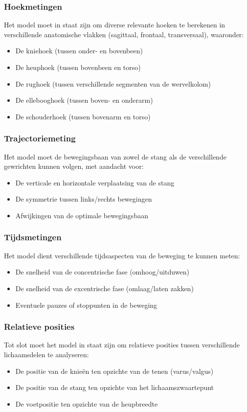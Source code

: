 \subsubsection{Hoekmetingen}
Het model moet in staat zijn om diverse relevante hoeken te berekenen in verschillende anatomische vlakken (sagittaal, frontaal, transversaal), waaronder:
\begin{itemize}
    \item De kniehoek (tussen onder- en bovenbeen)
    \item De heuphoek (tussen bovenbeen en torso)
    \item De rughoek (tussen verschillende segmenten van de wervelkolom)
    \item De ellebooghoek (tussen boven- en onderarm)
    \item De schouderhoek (tussen bovenarm en torso)
\end{itemize}

\subsubsection{Trajectoriemeting}
Het model moet de bewegingsbaan van zowel de stang als de verschillende gewrichten kunnen volgen, met aandacht voor:
\begin{itemize}
    \item De verticale en horizontale verplaatsing van de stang
    \item De symmetrie tussen links/rechts bewegingen
    \item Afwijkingen van de optimale bewegingsbaan
\end{itemize}

\subsubsection{Tijdsmetingen}
Het model dient verschillende tijdsaspecten van de beweging te kunnen meten:
\begin{itemize}
    \item De snelheid van de concentrische fase (omhoog/uitduwen)
    \item De snelheid van de excentrische fase (omlaag/laten zakken)
    \item Eventuele pauzes of stoppunten in de beweging
\end{itemize}

\subsubsection{Relatieve posities}
Tot slot moet het model in staat zijn om relatieve posities tussen verschillende lichaamsdelen te analyseren:
\begin{itemize}
    \item De positie van de knieën ten opzichte van de tenen (varus/valgus)
    \item De positie van de stang ten opzichte van het lichaamszwaartepunt
    \item De voetpositie ten opzichte van de heupbreedte
\end{itemize}

